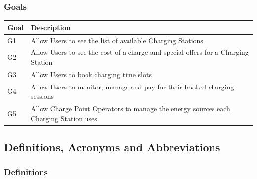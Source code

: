 \documentclass[11pt]{article}
\begin{document}

\subsubsection{Goals}

\begin{table}[H]
    \centering
    \setlength{\tabcolsep}{18pt}
    \renewcommand{\arraystretch}{1.2}
    \begin{tabularx}{\textwidth}{|>{\centering\hsize=0.3\hsize}X|>{\hsize=1.7\hsize}X|}
        \hline
        \textbf{Goal} & \textbf{Description} \\
        \hline
        G1 & Allow Users to see the list of available Charging Stations \\
        \hline
        G2 & Allow Users to see the cost of a charge and special offers for a Charging Station \\
        \hline
        G3 & Allow Users to book charging time slots \\
        \hline
        G4 & Allow Users to monitor, manage and pay for their booked charging sessions \\
        \hline
        G5 & Allow Charge Point Operators to manage the energy sources each Charging Station uses \\
        \hline
    \end{tabularx}
    \label{tab:goals}
\end{table}

\subsection{Definitions, Acronyms and Abbreviations}

\subsubsection{Definitions}
\end{document}
